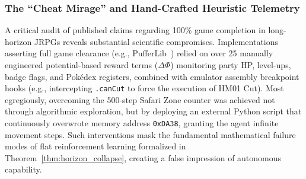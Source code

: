 \documentclass[journal,10pt,twocolumn]{IEEEtran}
\begin{document}
\subsubsection{The ``Cheat Mirage'' and Hand-Crafted Heuristic Telemetry}
A critical audit of published claims regarding 100\% game completion in long-horizon JRPGs reveals substantial scientific compromises. Implementations asserting full game clearance (e.g., PufferLib~\cite{rubinstein2025puffer}) relied on over 25 manually engineered potential-based reward terms ($\Delta\Phi$) monitoring party HP, level-ups, badge flags, and Pok{\'e}dex registers, combined with emulator assembly breakpoint hooks (e.g., intercepting \texttt{.canCut} to force the execution of HM01 Cut). Most egregiously, overcoming the 500-step Safari Zone counter was achieved not through algorithmic exploration, but by deploying an external Python script that continuously overwrote memory address \texttt{0xDA38}, granting the agent infinite movement steps. Such interventions mask the fundamental mathematical failure modes of flat reinforcement learning formalized in Theorem~\ref{thm:horizon_collapse}, creating a false impression of autonomous capability.
\end{document}
